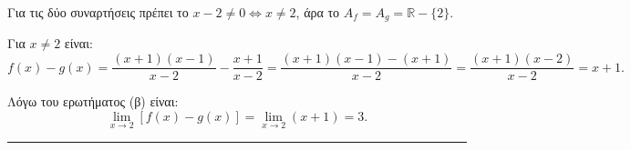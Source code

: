 \begin{alist}
    \item Για τις δύο συναρτήσεις πρέπει το $x-2 \neq 0 \Leftrightarrow x \neq 2$, άρα το $A_f = A_g = \mathbb{R} - \{2\}$.
    \item Για $x \neq 2$ είναι:
    \[ f(x)-g(x) = \frac{(x+1)(x-1)}{x-2} - \frac{x+1}{x-2} = \frac{(x+1)(x-1)-(x+1)}{x-2} = \frac{(x+1)(x-2)}{x-2} = x+1. \]
    \item Λόγω του ερωτήματος (β) είναι:
    \[ \lim\limits_{x \to 2}[f(x)-g(x)] = \lim\limits_{x \to 2}(x+1) = 3. \]
\end{alist}
\vspace{6mm}
\noindent\rule{\textwidth}{0.4pt}
\vspace{6mm}


